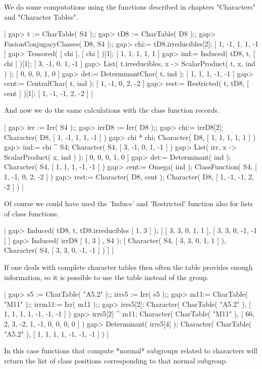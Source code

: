 We do some computations using the functions described in chapters
"Characters" and "Character Tables".

|    gap> t   := CharTable( S4 );;
    gap> tD8 := CharTable( D8 );;
    gap> FusionConjugacyClasses( D8, S4 );;
    gap> chi:= tD8.irreducibles[2];
    [ 1, -1, 1, 1, -1 ]
    gap> Tensored( [ chi ], [ chi ] )[1];
    [ 1, 1, 1, 1, 1 ]
    gap> ind:= Induced( tD8, t, [ chi ] )[1];
    [ 3, -1, 0, 1, -1 ]
    gap> List( t.irreducibles, x -> ScalarProduct( t, x, ind ) );
    [ 0, 0, 0, 1, 0 ]
    gap> det:= DeterminantChar( t, ind );
    [ 1, 1, 1, -1, -1 ]
    gap> cent:= CentralChar( t, ind );
    [ 1, -1, 0, 2, -2 ]
    gap> rest:= Restricted( t, tD8, [ cent ] )[1];
    [ 1, -1, -1, 2, -2 ] |

And now we do the same calculations with the class function records.

|    gap> irr   := Irr( S4 );;
    gap> irrD8 := Irr( D8 );;
    gap> chi:= irrD8[2];
    Character( D8, [ 1, -1, 1, 1, -1 ] )
    gap> chi * chi;
    Character( D8, [ 1, 1, 1, 1, 1 ] )
    gap> ind:= chi ^ S4;
    Character( S4, [ 3, -1, 0, 1, -1 ] )
    gap> List( irr, x -> ScalarProduct( x, ind ) );
    [ 0, 0, 0, 1, 0 ]
    gap> det:= Determinant( ind );
    Character( S4, [ 1, 1, 1, -1, -1 ] )
    gap> cent:= Omega( ind );
    ClassFunction( S4, [ 1, -1, 0, 2, -2 ] )
    gap> rest:= Character( D8, cent );
    Character( D8, [ 1, -1, -1, 2, -2 ] ) |

Of course we could have used the 'Induce' and 'Restricted' function
also for lists of class functions.

|    gap> Induced( tD8, t, tD8.irreducibles{ [ 1, 3 ] } );
    [ [ 3, 3, 0, 1, 1 ], [ 3, 3, 0, -1, -1 ] ]
    gap> Induced( irrD8{ [ 1, 3 ] }, S4 );
    [ Character( S4, [ 3, 3, 0, 1, 1 ] ), 
      Character( S4, [ 3, 3, 0, -1, -1 ] ) ] |

If one deals with complete character tables then often the table
provides enough information, so it is possible to use the table
instead of the group.

|    gap> s5 := CharTable( "A5.2" );; irrs5 := Irr( s5  );;
    gap> m11:= CharTable( "M11"  );; irrm11:= Irr( m11 );;
    gap> irrs5[2];
    Character( CharTable( "A5.2" ), [ 1, 1, 1, 1, -1, -1, -1 ] )
    gap> irrs5[2] ^ m11;
    Character( CharTable( "M11" ), [ 66, 2, 3, -2, 1, -1, 0, 0, 0, 0 ] )
    gap> Determinant( irrs5[4] );
    Character( CharTable( "A5.2" ), [ 1, 1, 1, 1, -1, -1, -1 ] ) |

In this case functions that compute *normal* subgroups related to
characters will return the list of class positions corresponding to that
normal subgroup.

